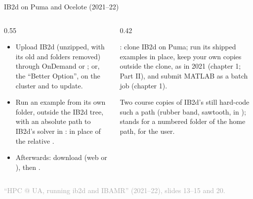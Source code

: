 \documentclass[aspectratio=169,11pt]{beamer}
\newcommand{\sourcecredit}[1]{\vfill\begin{flushright}\tiny\textcolor{DarkGray}{#1}\end{flushright}}
\begin{document}
\begin{frame}{IB2d on Puma and Ocelote (2021--22)}
\label{fr:ib2dua}
\begin{columns}[T,onlytextwidth]
\begin{column}{0.55\textwidth}
\footnotesize
\begin{itemize}\setlength{\itemsep}{2pt}
  \item Upload IB2d (unzipped, with its old  and  folders removed) through OnDemand or ; or, the ``Better Option'',  on the cluster and  to update.
  \item Run an example from its own folder, outside the IB2d tree, with an absolute path to IB2d's solver in :  in place of the relative .
  \item Afterwards: download  (web or ), then .
\end{itemize}
\end{column}
\begin{column}{0.42\textwidth}
\begin{punchbox}
\small {}: clone IB2d on Puma; run its shipped examples in place, keep your own copies outside the clone, as in 2021 (chapter 1; Part II), and submit MATLAB as a batch job (chapter 1).
\end{punchbox}
\vspace{2mm}
\footnotesize Two course copies of IB2d's  still hard-code such a path (rubber band, sawtooth, in );  stands for a numbered folder of the home path,  for the user.
\end{column}
\end{columns}
\sourcecredit{``HPC @ UA, running ib2d and IBAMR'' (2021--22), slides 13--15 and 20.}
\end{frame}
\end{document}
